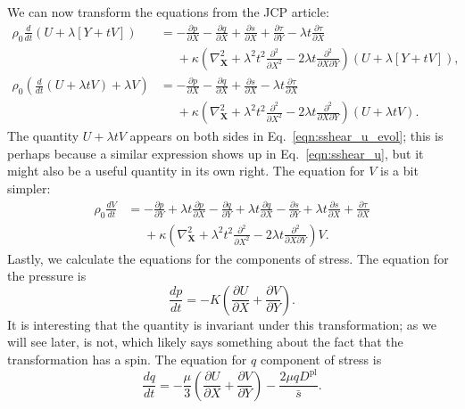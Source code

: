 \documentclass[11pt]{article}
\newcommand{\p}{\partial}
\newcommand{\bX}{\mathbf{X}}
\newcommand{\Dpl}{D^\text{pl}}
\begin{document}
We can now transform the equations from the JCP article:
\begin{align}
    \rho_0 \frac{d}{dt}\left(U + \lambda[Y + tV]\right) &= -\frac{\p p}{\p X} - \frac{\p q}{\p X} + \frac{\p s}{\p X} + \frac{\p \tau}{\p Y} - \lambda t \frac{\p \tau}{\p X} \nonumber\\
    &\phantom{=} + \kappa\left(\nabla_\bX^2 + \lambda^2t^2\frac{\p^2}{\p X^2} - 2\lambda t \frac{\p^2}{\p X\p Y}\right)\left(U + \lambda[Y + tV]\right),\nonumber\\
    \rho_0\left(\frac{d}{dt}(U + \lambda t V) + \lambda V\right) &= -\frac{\p p}{\p X} - \frac{\p q}{\p X} + \frac{\p s}{\p X} - \lambda t\frac{\p \tau}{\p X} \nonumber \\
    &\phantom{=} + \kappa\left(\nabla_\bX^2 + \lambda^2t^2\frac{\p^2}{\p X^2} - 2\lambda t \frac{\p^2}{\p X\p Y}\right)(U + \lambda t V). \label{eqn:sshear_u_evol}
\end{align}
The quantity $U + \lambda t V$ appears on both sides in Eq.~\ref{eqn:sshear_u_evol}; this is perhaps because a similar expression shows up in Eq.~\ref{eqn:sshear_u}, but it might also be a useful quantity in its own right.
The equation for $V$ is a bit simpler:
\begin{align}
    \rho_0 \frac{dV}{dt} &= -\frac{\p p}{\p Y} + \lambda t \frac{\p p}{\p X} - \frac{\p q}{\p Y} + \lambda t \frac{\p q}{\p X} - \frac{\p s}{\p Y} + \lambda t\frac{\p s}{\p X} + \frac{\p\tau}{\p X} \nonumber \\
    &\phantom{=} + \kappa \left(\nabla_\bX^2 + \lambda^2t^2\frac{\p^2}{\p X^2} - 2\lambda t\frac{\p^2}{\p X\p Y}\right) V.
    \label{eqn:sshear_v_evol}
\end{align}
Lastly, we calculate the equations for the components of stress. The equation for the pressure is
\begin{equation}
    \frac{dp}{dt} = -K\left(\frac{\p U}{\p X} + \frac{\p V}{\p Y}\right).
    \label{eqn:sshear_p_evol}
\end{equation}
It is interesting that the quantity \smash{$\frac{\p u}{\p x} + \frac{\p v}{\p y}$} is invariant under this transformation; as we will see later, \smash{$\frac{\p u}{\p y} - \frac{\p v}{\p x}$} is not, which likely says something about the fact that the transformation has a spin. The equation for $q$ component of stress is
\begin{equation}
    \frac{dq}{dt} = -\frac{\mu}{3}\left(\frac{\p U}{\p X} + \frac{\p V}{\p Y}\right) - \frac{2\mu q\Dpl}{\bar{s}}.
    \label{eqn:sshear_q_evol}
\end{equation}
\end{document}
